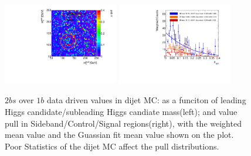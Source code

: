 \begin{figure}[htbp!]
\begin{center}
\includegraphics[width=0.45\textwidth,angle=-90]{figures/boosted/AppendixMuqcdstudy/QCD_TwoTag_split_Incl_mH0H1.pdf}
\includegraphics[width=0.45\textwidth,angle=-90]{figures/boosted/AppendixMuqcdstudy/QCD_TwoTag_split_Incl_mH0H1_pull.pdf}
\caption{$2bs$ over $1b$ data driven \muqcd values in dijet MC: \muqcd as a funciton of leading Higgs candidate/subleading Higgs candiate mass(left); and \muqcd value pull in Sideband/Control/Signal regions(right), with the weighted mean value and the Guassian fit mean value shown on the plot. Poor Statistics of the dijet MC affect the pull distributions.}
\label{fig:app-muqcd-2bs-qcd}
\end{center}
\end{figure}

